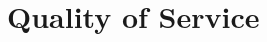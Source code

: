 
\begin{comment}
comment from Manoj
- try to reference ISO/IEC 9126 for the quality attributes: refer to the slides sent by Manoj on Nov 02
- Also include the formula of the metrics and discuss about them and simplify them: refer to the slides sent by Manoj on Nov 02
- The quality attributes which can make more sense according to the priority to microservices: refer to the slides sent by Manoj on Nov 02
- Relationship between the quality attributes and their tradeoffs, what happens when we try to increase cohesion.. how it affect other attributes?
- create wiki page in the sebis page to document the literature review.

comment from Andrea
- mention about coupling created by calling same database directly by multiple microservice
use the formula to calculate quality metrics for the services at hybris to give an idea about good and bad service, the process of finding out good service at first and then using the quality metrics finding out the range of quality metrics, which can then be used to identify bad services
\end{comment}



\chapter{Quality of Service}\label{chapter:quality_of_service}

